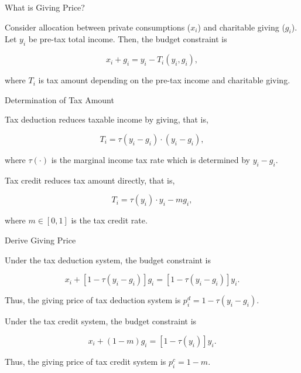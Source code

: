 \documentclass[
  ignorenonframetext,
]{beamer}
\begin{document}
\begin{frame}{What is Giving Price?}
\protect\hypertarget{what-is-giving-price}{}

Consider allocation between private consumptions (\(x_i\)) and
charitable giving (\(g_i\)). Let \(y_i\) be pre-tax total income. Then,
the budget constraint is

\[
    x_i + g_i = y_i - T_i(y_i, g_i),
\]

where \(T_i\) is tax amount depending on the pre-tax income and
charitable giving.

\end{frame}

\begin{frame}{Determination of Tax Amount}
\protect\hypertarget{determination-of-tax-amount}{}

Tax deduction reduces taxable income by giving, that is,

\[
    T_i = \tau(y_i - g_i) \cdot (y_i - g_i),
\]

where \(\tau(\cdot)\) is the marginal income tax rate which is
determined by \(y_i - g_i\).

Tax credit reduces tax amount directly, that is,

\[
    T_i = \tau(y_i)\cdot y_i - m g_i,
\]

where \(m \in [0, 1]\) is the tax credit rate.

\end{frame}

\begin{frame}{Derive Giving Price}
\protect\hypertarget{derive-giving-price}{}

Under the tax deduction system, the budget constraint is

\[
    x_i + [1 - \tau(y_i - g_i)]g_i = [1 - \tau(y_i - g_i)] y_i.
\]

Thus, the giving price of tax deduction system is
\(p_i^{d} = 1 - \tau(y_i - g_i)\).

Under the tax credit system, the budget constraint is

\[
    x_i + (1 - m) g_i = [1 - \tau(y_i)] y_i.
\]

Thus, the giving price of tax credit system is \(p_i^c = 1 - m\).

\end{frame}
\end{document}
